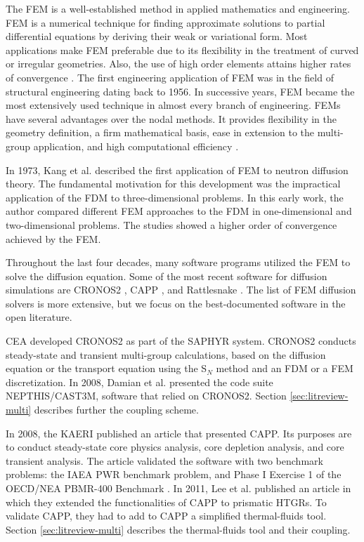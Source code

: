 The \gls{FEM} is a well-established method in applied mathematics and engineering.
\gls{FEM} is a numerical technique for finding approximate solutions to partial differential equations by deriving their weak or variational form.
Most applications make \gls{FEM} preferable due to its flexibility in the treatment of curved or irregular geometries.
Also, the use of high order elements attains higher rates of convergence \cite{cavdar_finite_2004}.
The first engineering application of \gls{FEM} was in the field of structural engineering dating back to 1956.
In successive years, \gls{FEM} became the most extensively used technique in almost every branch of engineering.
\glspl{FEM} have several advantages over the nodal methods.
It provides flexibility in the geometry definition, a firm mathematical basis, ease in extension to the multi-group application, and high computational efficiency \cite{lee_development_2008}.

In 1973, Kang et al. \cite{kang_finite_1973} described the first application of \gls{FEM} to neutron diffusion theory.
The fundamental motivation for this development was the impractical application of the \gls{FDM} to three-dimensional problems.
In this early work, the author compared different \gls{FEM} approaches to the \gls{FDM} in one-dimensional and two-dimensional problems.
The studies showed a higher order of convergence achieved by the \gls{FEM}.

Throughout the last four decades, many software programs utilized the \gls{FEM} to solve the diffusion equation.
Some of the most recent software for diffusion simulations are CRONOS2 \cite{lautard_cronos_1990}, CAPP \cite{lee_development_2011}, and Rattlesnake \cite{wang_rattlesnake_2019}.
The list of \gls{FEM} diffusion solvers is more extensive, but we focus on the best-documented software in the open literature.

\gls{CEA} developed CRONOS2 \cite{lautard_cronos_1990} as part of the SAPHYR system.
CRONOS2 conducts steady-state and transient multi-group calculations, based on the diffusion equation or the transport equation using the S$_N$ method and an \gls{FDM} or a \gls{FEM} discretization.
In 2008, Damian et al. \cite{damian_vhtr_2008} presented the code suite NEPTHIS\cite{cavalier_presentation_2005}/CAST3M\cite{studer_cast3marcturus_2007}, software that relied on CRONOS2.
Section \ref{sec:litreview-multi} describes further the coupling scheme.

In 2008, the \gls{KAERI} published an article \cite{lee_development_2008} that presented CAPP.
Its purposes are to conduct steady-state core physics analysis, core depletion analysis, and core transient analysis.
The article validated the software with two benchmark problems: the IAEA PWR benchmark problem, and Phase I Exercise 1 of the OECD/NEA PBMR-400 Benchmark \cite{reitsma_oecd-neansc_2008}.
In 2011, Lee et al. published an article \cite{lee_development_2011} in which they extended the functionalities of CAPP to prismatic HTGRs.
To validate CAPP, they had to add to CAPP a simplified thermal-fluids tool.
Section \ref{sec:litreview-multi} describes the thermal-fluids tool and their coupling.

